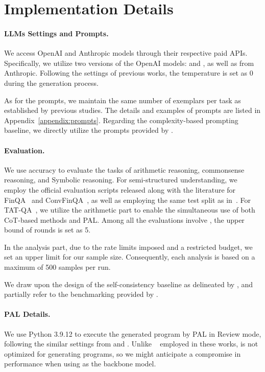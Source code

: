 \section{Implementation Details}
\label{appendix:impl-details}

\paragraph{LLMs Settings and Prompts.} 

We access OpenAI and Anthropic models through their respective paid APIs. 
Specifically, 
we utilize two versions of the OpenAI models: \turbo and \gpt, 
as well as \claude from Anthropic.
Following the settings of previous works,
the temperature is set as 0 during the generation process.

As for the prompts,
we maintain the same number of exemplars per task as established by previous studies.
The details and examples of prompts are listed in Appendix~\ref{appendix:prompts}.
Regarding the complexity-based prompting baseline, 
we directly utilize the prompts provided by \citet{fu2023cothub}.

\paragraph{Evaluation.} 
We use accuracy to evaluate the tasks of arithmetic reasoning, commonsense reasoning, and Symbolic reasoning.
For semi-structured understanding,
we employ the official evaluation scripts released along with the literature for FinQA~\citep{chen2021finqa} and ConvFinQA~\citep{chen2022convfinqa},
as well as employing the same test split as in~\citet{chen2022program}.
For TAT-QA~\citep{zhu2021tatqa},
we utilize the arithmetic part to enable the simultaneous use of both CoT-based methods and PAL.
Among all the evaluations involve \crd,
the upper bound of rounds is set as 5.

In the analysis part,
due to the rate limits imposed and a restricted budget, 
we set an upper limit for our sample size. 
Consequently, 
each analysis is based on a maximum of 500 samples per run. 

We draw upon the design of the self-consistency baseline as delineated by \citet{wu2023openicl},
and partially refer to the benchmarking provided by \citet{wang2023hugnlp}.

\paragraph{PAL Details.}

We use Python 3.9.12 to execute the generated program by PAL in Review mode,
following the similar settings from \citet{gao2022pal} and \citet{chen2022program}.
Unlike \codex~\citep{chen2021evaluating} employed in these works,
\turbon is not optimized for generating programs, 
so we might anticipate a compromise in performance when using \turbon as the backbone model.